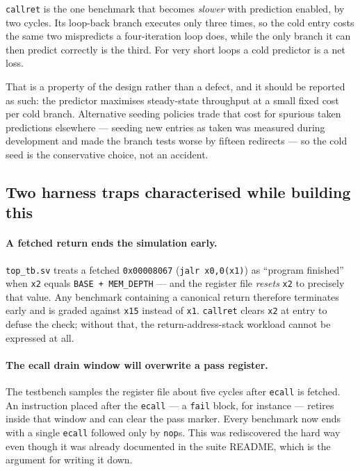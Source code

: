 \documentclass[11pt]{article}
\begin{document}
\texttt{callret} is the one benchmark that becomes \emph{slower} with prediction enabled,
by two cycles. Its loop-back branch executes only three times, so the cold entry costs
the same two mispredicts a four-iteration loop does, while the only branch it can then
predict correctly is the third. For very short loops a cold predictor is a net loss.

That is a property of the design rather than a defect, and it should be reported as such:
the predictor maximises steady-state throughput at a small fixed cost per cold branch.
Alternative seeding policies trade that cost for spurious taken predictions elsewhere ---
seeding new entries as taken was measured during development and made the branch tests
worse by fifteen redirects --- so the cold seed is the conservative choice, not an
accident.

\subsection{Two harness traps characterised while building this}
\enlargethispage{5\baselineskip}

\paragraph{A fetched return ends the simulation early.} \texttt{top\_tb.sv}
treats a fetched \texttt{0x00008067} (\texttt{jalr x0,0(x1)}) as ``program finished''
when \texttt{x2} equals \texttt{BASE + MEM\_DEPTH} --- and the register file \emph{resets}
\texttt{x2} to precisely that value. Any benchmark containing a canonical return therefore
terminates early and is graded against \texttt{x15} instead of \texttt{x1}. \texttt{callret}
clears \texttt{x2} at entry to defuse the check; without that, the return-address-stack
workload cannot be expressed at all.

\paragraph{The ecall drain window will overwrite a pass register.} The testbench samples
the register file about five cycles after \texttt{ecall} is fetched. An instruction placed
after the \texttt{ecall} --- a \texttt{fail} block, for instance --- retires inside that
window and can clear the pass marker. Every benchmark now ends with a single \texttt{ecall}
followed only by \texttt{nop}s. This was rediscovered the hard way even though it was
already documented in the suite README, which is the argument for writing it down.
\end{document}
